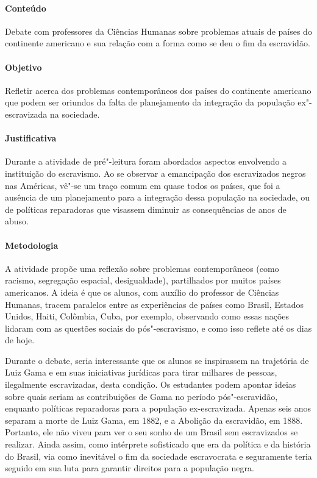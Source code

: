 \documentclass[12pt]{extarticle}
\begin{document}
\paragraph{Conteúdo} Debate com professores da Ciências Humanas
sobre problemas atuais de países do continente americano e sua
relação com a forma como se deu o fim da escravidão.

\paragraph{Objetivo} Refletir acerca dos problemas contemporâneos dos países do 
continente americano que podem ser oriundos da falta de planejamento da 
integração da população ex"-escravizada na sociedade.

\paragraph{Justificativa} Durante a atividade de pré"-leitura foram abordados aspectos
envolvendo a instituição do escravismo. Ao se observar a emancipação dos
escravizados negros nas Américas, vê"-se um traço comum em quase todos os
países, que foi a ausência de um planejamento para a integração dessa
população na sociedade, ou de políticas reparadoras que visassem
diminuir as consequências de anos de abuso. 

\paragraph{Metodologia} A atividade propõe uma reflexão 
sobre problemas contemporâneos (como racismo,
segregação espacial, desigualdade), partilhados por muitos países
americanos. A ideia é que os alunos, com auxílio do professor de
Ciências Humanas, tracem paralelos entre as experiências de países como
Brasil, Estados Unidos, Haiti, Colômbia, Cuba, por exemplo, observando
como essas nações lidaram com as questões sociais do pós"-escravismo, e
como isso reflete até os dias de hoje.

Durante o debate, seria interessante que os alunos se inspirassem
na trajetória de Luiz Gama e em suas iniciativas jurídicas 
para tirar milhares de pessoas, ilegalmente escravizadas, desta
condição. Os estudantes podem apontar ideias 
sobre quais seriam as contribuições de Gama no período pós"-escravidão,
enquanto políticas reparadoras para a população ex-escravizada. 
Apenas seis anos separam a morte de Luiz Gama, em 1882, e a Abolição da escravidão, em 1888. 
Portanto, ele não viveu para ver o seu sonho de um Brasil sem escravizados se realizar.
Ainda assim, como intérprete sofisticado que era da política e da história do Brasil, via
como inevitável o fim da sociedade escravocrata e seguramente teria seguido em sua 
luta para garantir direitos para a população negra.
\end{document}
